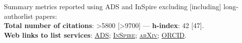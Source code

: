Summary metrics reported using ADS and InSpire excluding [including] long-authorlist papers:
\\
\textcolor{mark_color}{\textbf{Total number of citations}}: >5800 [>9700]
 --- 
\textcolor{mark_color}{\textbf{h-index}}: 42 [47].
\\
\textcolor{mark_color}{\textbf{Web links to list services}}:
\href{https://davidegerosa.com/myads}{\textsc{ADS}};
\href{https://davidegerosa.com/myinspire}{\textsc{InSpire}};
\href{http://davidegerosa.com/myarxiv}{\textsc{arXiv}};
\href{https://davidegerosa.com/myorcid}{\textsc{ORCID}}.